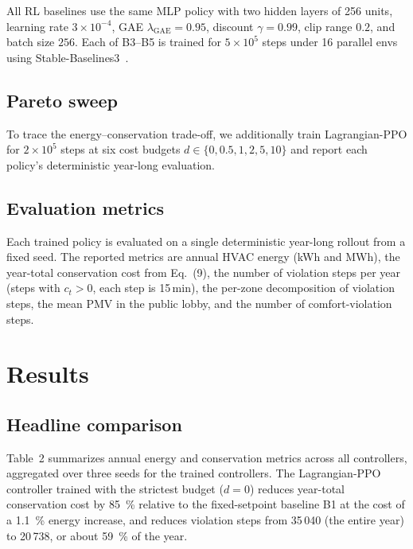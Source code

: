 \documentclass[11pt,a4paper]{article}
\begin{document}
All RL baselines use the same MLP policy with two hidden layers of
256 units, learning rate $3\times 10^{-4}$, GAE
$\lambda_{\mathrm{GAE}}=0.95$, discount $\gamma=0.99$, clip range
$0.2$, and batch size $256$. Each of B3--B5 is trained for
$5\times 10^{5}$ steps under 16 parallel envs using
Stable-Baselines3~\citep{raffin2021sb3}.

\subsection{Pareto sweep}

To trace the energy--conservation trade-off, we additionally train
Lagrangian-PPO for $2\times 10^{5}$ steps at six cost budgets
$d\in\{0,0.5,1,2,5,10\}$ and report each policy's deterministic
year-long evaluation.

\subsection{Evaluation metrics}\label{sec:metrics}

Each trained policy is evaluated on a single deterministic year-long
rollout from a fixed seed. The reported metrics are annual HVAC energy
(kWh and MWh), the year-total conservation cost from
Eq.~(9), the number of violation steps per year (steps
with $c_t>0$, each step is 15\,min), the per-zone decomposition of
violation steps, the mean PMV in the public lobby, and the number of
comfort-violation steps.

\section{Results}\label{sec:results}

\subsection{Headline comparison}

Table~2 summarizes annual energy and conservation
metrics across all controllers, aggregated over three seeds for the
trained controllers. The Lagrangian-PPO controller trained with the
strictest budget ($d=0$) reduces year-total conservation cost by
\SI{85}{\percent} relative to the fixed-setpoint baseline B1 at the
cost of a \SI{1.1}{\percent} energy increase, and reduces violation
steps from 35\,040 (the entire year) to 20\,738, or about
\SI{59}{\percent} of the year.
\end{document}
